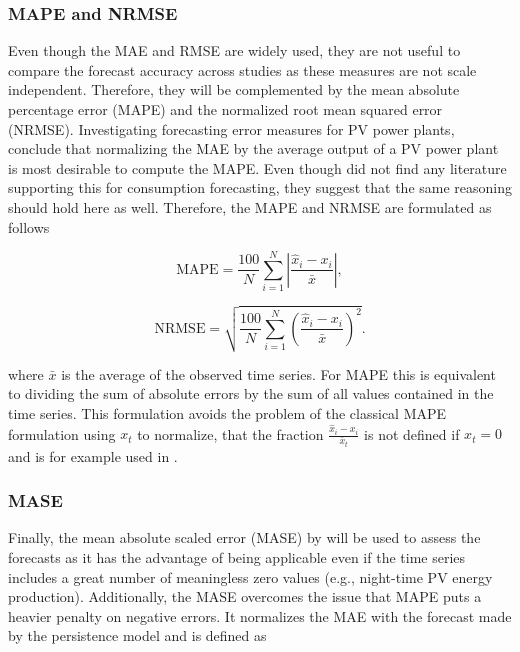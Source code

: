\subsubsection{MAPE and NRMSE}

Even though the MAE and RMSE are widely used, they are not useful to compare the forecast accuracy across studies as these measures are not scale independent. Therefore, they will be complemented by the mean absolute percentage error (MAPE) and the normalized root mean squared error (NRMSE). Investigating forecasting error measures for PV power plants, \citet{Hoff:2013} conclude that normalizing the MAE by the average output of a PV power plant is most desirable to compute the MAPE. Even though \citet{Meer:2018} did not find any literature supporting this for consumption forecasting, they suggest that the same reasoning should hold here as well. Therefore, the MAPE and NRMSE are formulated as follows

\begin{equation} \label{Eq:MAPE}
\text{MAPE}=\frac{100}{N}\sum_{i=1}^N\left|\frac{\widehat{x}_i-x_i}{\bar{x}}\right|,
\end{equation}

\begin{equation} \label{Eq:NRMSE}
\text{NRMSE}=\sqrt{\frac{100}{N}\sum_{i=1}^N\left(\frac{\widehat{x}_i-x_i}{\bar{x}}\right)^2}.
\end{equation}

where $\bar{x}$ is the average of the observed time series. For MAPE this is equivalent to dividing the sum of absolute errors by the sum of all values contained in the time series. This formulation avoids the problem of the classical MAPE formulation using $x_t$ to normalize, that the fraction $\frac{\widehat{x}_i-x_i}{\bar{x}_t}$ is not defined if $x_t=0$ and is for example used in \citet{Yamin:2004}.



\subsubsection{MASE}

Finally, the mean absolute scaled error (MASE) by \citet{Hyndman:2006} will be used to assess the forecasts as it has the advantage of being applicable even if the time series includes a great number of meaningless zero values (e.g., night-time PV energy production). Additionally, the MASE overcomes the issue that MAPE puts a heavier penalty on negative errors. It normalizes the MAE with the forecast made by the persistence model and is defined as

